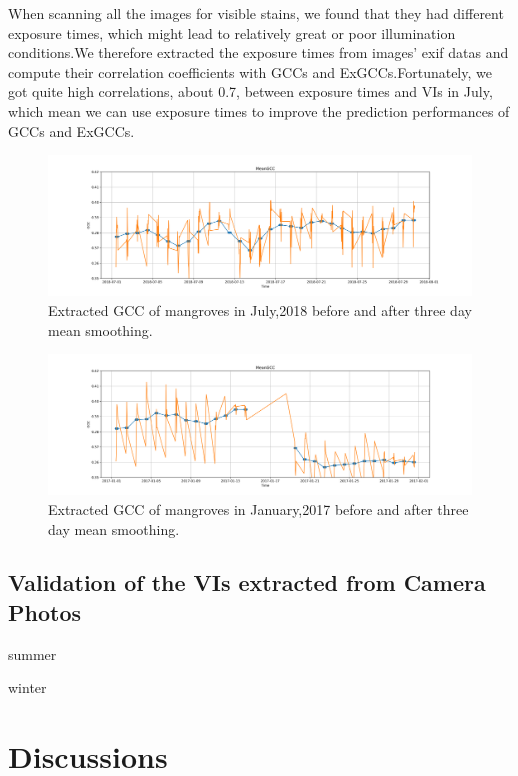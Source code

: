 \documentclass{article}
\begin{document}
When scanning all the images for visible stains, we found that they had different exposure times, which might lead to relatively great or poor illumination conditions.We therefore extracted the exposure times from images' exif datas and compute their correlation  coefficients with GCCs and ExGCCs.Fortunately, we got quite high correlations, about 0.7, between exposure times and VIs in July, which mean we can use exposure times to improve the prediction performances of GCCs and ExGCCs.
\begin{figure}
  \centering
  \includegraphics[width=1\textwidth]{pictures/meanGCC.png}
  \caption{Extracted GCC of mangroves in July,2018 before and after three day mean smoothing.}
  \label{fig:fig1}
\end{figure}

\begin{figure}
  \centering
  \includegraphics[width=1\textwidth]{pictures/JanmeanGCC.png}
  \caption{Extracted GCC of mangroves in January,2017 before and after three day mean smoothing.}
  \label{fig:fig2}
\end{figure}


\subsection{Validation of the VIs extracted from Camera Photos}

summer 

winter




\section{Discussions} 
\end{document}
